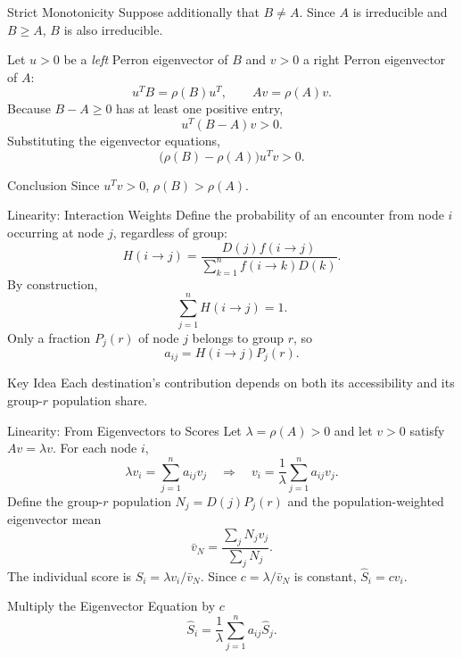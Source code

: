 \documentclass[aspectratio=169,10pt]{beamer}
\begin{document}
\begin{frame}[shrink=0]{Strict Monotonicity}
\small
Suppose additionally that $B\ne A$. Since $A$ is irreducible
and $B\ge A$, $B$ is also irreducible.

Let $u>0$ be a \emph{left} Perron eigenvector of $B$ and
$v>0$ a right Perron eigenvector of $A$:
\[
u^TB=\rho(B)u^T,\qquad Av=\rho(A)v.
\]
Because $B-A\ge0$ has at least one positive entry,
\[
u^T(B-A)v>0.
\]
Substituting the eigenvector equations,
\[
\bigl(\rho(B)-\rho(A)\bigr)u^Tv>0.
\]
\begin{block}{Conclusion}
Since $u^Tv>0$, \(\boxed{\rho(B)>\rho(A)}\).
\end{block}
\end{frame}

\begin{frame}[shrink=0]{Linearity: Interaction Weights}
\small
Define the probability of an encounter from node $i$ occurring
at node $j$, regardless of group:
\[
H(i\to j)=\frac{D(j)f(i\to j)}
{\sum_{k=1}^{n}f(i\to k)D(k)}.
\]
By construction,
\[
\sum_{j=1}^{n}H(i\to j)=1.
\]
Only a fraction $P_j(r)$ of node $j$ belongs to group $r$, so
\[
\boxed{a_{ij}=H(i\to j)P_j(r).}
\]
\begin{block}{Key Idea}
Each destination's contribution depends on both its accessibility
and its group-$r$ population share.
\end{block}
\end{frame}

\begin{frame}[shrink=0]{Linearity: From Eigenvectors to Scores}
\small
Let $\lambda=\rho(A)>0$ and let $v>0$ satisfy $Av=\lambda v$.
For each node $i$,
\[
\lambda v_i=\sum_{j=1}^{n}a_{ij}v_j
\quad\Longrightarrow\quad
v_i=\frac{1}{\lambda}\sum_{j=1}^{n}a_{ij}v_j.
\]
Define the group-$r$ population $N_j=D(j)P_j(r)$ and the
population-weighted eigenvector mean
\[
\bar v_N=\frac{\sum_jN_jv_j}{\sum_jN_j}.
\]
The individual score is $\hat S_i=\lambda v_i/\bar v_N$.
Since $c=\lambda/\bar v_N$ is constant, $\hat S_i=cv_i$.
\begin{block}{Multiply the Eigenvector Equation by $c$}
\[
\boxed{\hat S_i=\frac{1}{\lambda}
\sum_{j=1}^{n}a_{ij}\hat S_j.}
\]
\end{block}
\end{frame}
\end{document}
